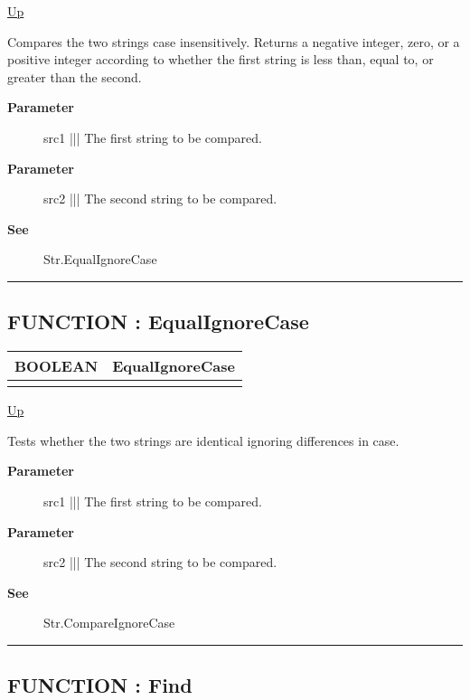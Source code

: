 \hyperlink{ecldoc:Str}{Up}

\par
Compares the two strings case insensitively. Returns a negative integer, zero, or a positive integer according to whether the first string is less than, equal to, or greater than the second.

\par
\begin{description}
\item [\textbf{Parameter}] src1 ||| The first string to be compared.
\item [\textbf{Parameter}] src2 ||| The second string to be compared.
\item [\textbf{See}] Str.EqualIgnoreCase
\end{description}

\rule{\textwidth}{0.4pt}
\subsection*{FUNCTION : EqualIgnoreCase}
\hypertarget{ecldoc:str.equalignorecase}{}

{\renewcommand{\arraystretch}{1.5}
\begin{tabularx}{\textwidth}{|>{\raggedright\arraybackslash}l|X|}
\hline
\hspace{0pt}BOOLEAN & EqualIgnoreCase \\
\hline
\multicolumn{2}{|>{\raggedright\arraybackslash}X|}{\hspace{0pt}(STRING src1, STRING src2)} \\
\hline
\end{tabularx}
}

\hyperlink{ecldoc:Str}{Up}

\par
Tests whether the two strings are identical ignoring differences in case.

\par
\begin{description}
\item [\textbf{Parameter}] src1 ||| The first string to be compared.
\item [\textbf{Parameter}] src2 ||| The second string to be compared.
\item [\textbf{See}] Str.CompareIgnoreCase
\end{description}

\rule{\textwidth}{0.4pt}
\subsection*{FUNCTION : Find}
\hypertarget{ecldoc:str.find}{}

